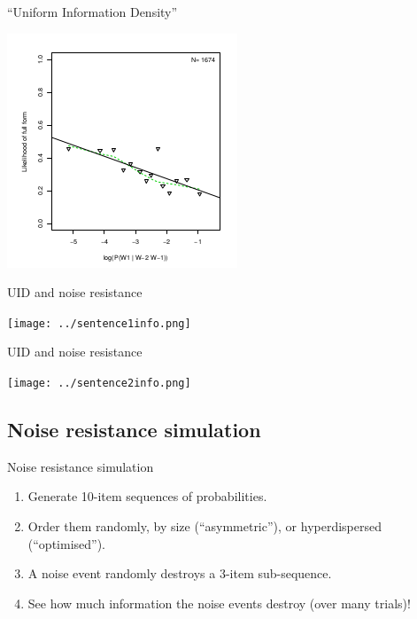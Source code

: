 \documentclass[hyperref={pdfpagelabels=false}]{beamer}
\begin{document}
\begin{frame}{``Uniform Information Density''} 
\begin{center}
\includegraphics[scale=1.15]{levyPlot.png}
\end{center}

\end{frame}


\begin{frame}{UID and noise resistance} 

\begin{center}
\texttt{[image: ../sentence1info.png]} 
\end{center}

\end{frame}

\begin{frame}{UID and noise resistance} 

\begin{center}
	\texttt{[image: ../sentence2info.png]} 
\end{center}

\end{frame}


\subsection{Noise resistance simulation}

\begin{frame}{Noise resistance simulation} 
\begin{enumerate}
	\item Generate 10-item sequences of probabilities.
	\item Order them randomly, by size (``asymmetric''), or hyperdispersed (``optimised'').
	\item A noise event randomly destroys a 3-item sub-sequence.
	\item See how much information the noise events destroy (over many trials)!
\end{enumerate}
\end{frame}
\end{document}
